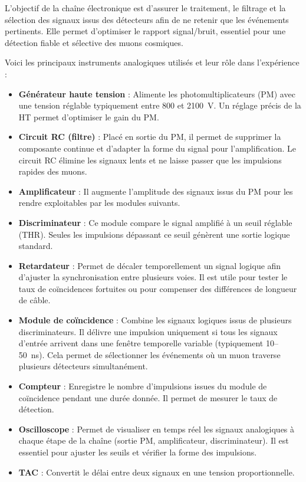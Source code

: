 \documentclass[a4paper,12pt,twoside]{article}
\begin{document}

\vspace{1em}
\begin{center}
\begin{tcolorbox}[colback=blue!5!white, colframe=blue!60!black, title=Principe de la chaîne électronique]
L’objectif de la chaîne électronique est d’assurer le traitement, le filtrage et la sélection des signaux issus des détecteurs afin de ne retenir que les événements pertinents. Elle permet d’optimiser le rapport signal/bruit, essentiel pour une détection fiable et sélective des muons cosmiques.
\end{tcolorbox}
\end{center}

Voici les principaux instruments analogiques utilisés et leur rôle dans l’expérience :

\begin{itemize}
  \item \textbf{Générateur haute tension} : Alimente les photomultiplicateurs (PM) avec une tension réglable typiquement entre 800 et 2100~V. Un réglage précis de la HT permet d’optimiser le gain du PM.
  \item \textbf{Circuit RC (filtre)} : Placé en sortie du PM, il permet de supprimer la composante continue et d’adapter la forme du signal pour l’amplification. Le circuit RC élimine les signaux lents et ne laisse passer que les impulsions rapides des muons.
  \item \textbf{Amplificateur} : Il augmente l’amplitude des signaux issus du PM pour les rendre exploitables par les modules suivants.
  \item \textbf{Discriminateur} : Ce module compare le signal amplifié à un seuil réglable (THR). Seules les impulsions dépassant ce seuil génèrent une sortie logique standard.
  \item \textbf{Retardateur} : Permet de décaler temporellement un signal logique afin d’ajuster la synchronisation entre plusieurs voies. Il est utile pour tester le taux de coïncidences fortuites ou pour compenser des différences de longueur de câble.
  \item \textbf{Module de coïncidence} : Combine les signaux logiques issus de plusieurs discriminateurs. Il délivre une impulsion uniquement si tous les signaux d’entrée arrivent dans une fenêtre temporelle variable (typiquement 10–50~ns). Cela permet de sélectionner les événements où un muon traverse plusieurs détecteurs simultanément.
  \item \textbf{Compteur} : Enregistre le nombre d’impulsions issues du module de coïncidence pendant une durée donnée. Il permet de mesurer le taux de détection.
  \item \textbf{Oscilloscope} : Permet de visualiser en temps réel les signaux analogiques à chaque étape de la chaîne (sortie PM, amplificateur, discriminateur). Il est essentiel pour ajuster les seuils et vérifier la forme des impulsions.
  \item \textbf{TAC} : Convertit le délai entre deux signaux en une tension proportionnelle.
\end{itemize}
\end{document}
